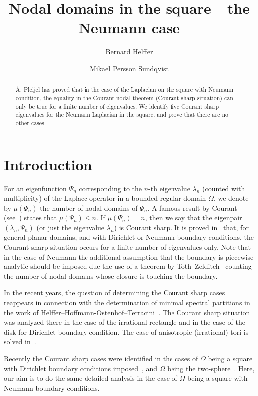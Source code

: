 \documentclass[a4paper,reqno,11pt]{amsart}
\title{Nodal domains in the square---the Neumann case}
\author{Bernard Helffer}
\author{Mikael Persson Sundqvist}
\theoremstyle{remark}
\theoremstyle{definition}
\numberwithin{equation}{section}
\begin{document}
\begin{abstract}
\AA. Pleijel has proved that in the case of the Laplacian on the square with 
Neumann condition, the equality in the Courant nodal theorem (Courant sharp 
situation) can only be true for a finite number of eigenvalues. 
We identify five Courant sharp eigenvalues for the Neumann Laplacian in
the square, and prove that there are no other cases.
\end{abstract}
\maketitle

\section{Introduction}

For an eigenfunction $\Psi_n$ corresponding to the $n$-th eigenvalue $\lambda_n$
(counted with multiplicity) of the Laplace operator in a bounded regular 
domain $\Omega$, we
denote by $\mu(\Psi_n)$ the number of nodal domains of $\Psi_n$. A famous
result by Courant (see~\cite{Cou}) states that $\mu(\Psi_n)\leq n$. If
$\mu(\Psi_n)=n$, then we say that the eigenpair $(\lambda_n,\Psi_n)$ (or just
the eigenvalue $\lambda_n$) is Courant sharp.
It is proved in~\cite{Pl,Pol} that, for general planar domains, and with
Dirichlet or Neumann boundary conditions, the Courant
sharp situation occurs for a finite number of eigenvalues only. 
Note that in the case of Neumann the additional assumption that the boundary is 
piecewise analytic should be imposed due the use of a theorem by 
Toth--Zelditch~\cite{ToZe} counting the number of nodal domains whose closure 
is touching the boundary.

In the recent years, the question of determining the Courant sharp cases 
reappears in connection with the determination of minimal spectral partitions 
in the work of Helffer--Hoffmann-Ostenhof--Terracini~\cite{HHOT}. The Courant 
sharp situation was analyzed there in the case of the irrational rectangle and 
in the case of the disk for Dirichlet boundary condition. The case of 
anisotropic (irrational) tori is solved in~\cite{HH}.

Recently the Courant sharp cases were identified in the cases of $\Omega$ being 
a square with Dirichlet boundary conditions imposed~\cite{Pl,BH}, and $\Omega$ 
being the two-sphere~\cite{BHSphere}. Here, our aim is to do the same detailed 
analysis in the case of $\Omega$ being a square with Neumann boundary conditions.
\end{document}
